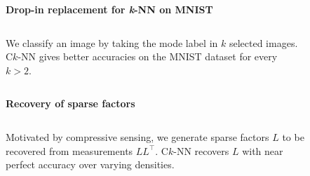 \documentclass{beamer}                             %
\newcommand{\blocktitle}[1]{{\Large \textbf{#1}}}
\begin{document}
\begin{frame}[t]
\begin{columns}[T]
\begin{column}{0.01\textwidth}
  \begin{center}
    \textcolor{darksilver}{\rule[-1cm]{1mm}{0.8\textheight}}
  \end{center}
\end{column}


\begin{column}{0.30\textwidth}
  \begin{tcolorbox}
    \blocktitle{Drop-in replacement for \textit{k}-NN on MNIST}

    \begin{columns}
      \begin{column}{0.5\textwidth}
        We classify an image by taking the mode label in
        \( k \) selected images. C\( k \)-NN gives better
        accuracies on the MNIST dataset for every \( k > 2 \).
      \end{column}
      \begin{column}{0.5\textwidth}
        \begin{figure}[t]
          \centering
          \label{fig:mnist}
        \end{figure}
      \end{column}
    \end{columns}
  \end{tcolorbox}

  \begin{tcolorbox}
    \blocktitle{Recovery of sparse factors}

    \begin{columns}
      \begin{column}{0.5\textwidth}
        Motivated by compressive sensing, we generate sparse factors \( L
        \) to be recovered from measurements \( L L^{\top} \). C\( k \)-NN
        recovers \( L \) with near perfect accuracy over varying densities.
      \end{column}
      \begin{column}{0.5\textwidth}
        \begin{figure}[t]
          \centering
          
          \label{fig:recover_acc}
        \end{figure}
      \end{column}
    \end{columns}
  \end{tcolorbox}


\end{column}
\end{columns}
\end{frame}
\end{document}
